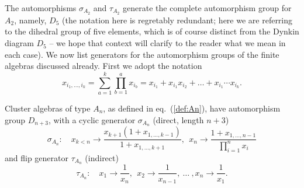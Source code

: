 \documentclass[11pt]{article}
\begin{document}
The automorphisms $\sigma_{A_2}$ and $\tau_{A_2}$ generate the complete automorphism group for $A_2$, namely, $D_5$ (the notation here is regretably redundant; here we are referring to the dihedral group of five elements, which is of course distinct from the Dynkin diagram $D_5$ -- we hope that context will clarify to the reader what we mean in each case). We now list generators for the automorphism groups of the finite algebras discussed already. First we adopt the notation
\begin{equation}
	x_{i_1,\ldots, i_k} = \sum_{a=1}^k \prod_{b=1}^a x_{i_b} = x_{i_1}+x_{i_1}x_{i_2} + \ldots + x_{i_1}\cdots x_{i_k}.
\end{equation}

Cluster algebras of type $A_n$, as defined in eq.~(\ref{def:An}), have automorphism group $D_{n+3}$, with a cyclic generator $\sigma_{A_n}$ (direct, length $n+3$)
\begin{equation}
  \sigma_{A_n}:\quad x_{k<n} \to \frac{x_{k+1}(1+x_{1,\ldots,k-1})}{1+x_{1,\ldots,k+1}},~~x_n\to\frac{1+x_{1,\ldots,n-1}}{\prod_{i=1}^n x_i}
\end{equation}
and flip generator $\tau_{A_n}$ (indirect)
\begin{equation}
  \tau_{A_n}: \quad x_1 \to \frac{1}{x_n},~~x_2 \to \frac{1}{x_{n-1}},~\ldots~,x_n\to\frac{1}{x_1}.
\end{equation}
\end{document}
